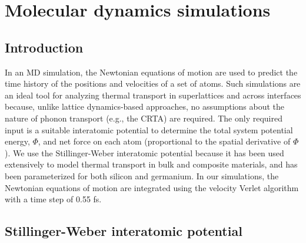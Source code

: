 \documentclass[letterpaper,12pt]{article}
\begin{document}
\clearpage

\section{\label{S-MD}Molecular dynamics simulations}

\subsection{\label{S-MD-intro}Introduction}

In an MD simulation, the Newtonian equations of motion are used to
predict the time history of the positions and velocities of a set of
atoms. Such simulations are an ideal tool for analyzing thermal
transport in superlattices and across interfaces because, unlike
lattice dynamics-based approaches, no assumptions about the nature
of phonon transport (e.g., the CRTA) are required. The only required
input is a suitable interatomic potential to determine the total
system potential energy, $\Phi$, and net force on each atom
(proportional to the spatial derivative of $\Phi$). We use the
Stillinger-Weber interatomic potential because it has been used
extensively to model thermal transport in bulk and composite
materials,\cite{zhao2005,schelling2002,schelling2003,volz2000,bodapati2006,becker2006}
and has been parameterized for both silicon\cite{stillinger1985} and
germanium.\cite{ding1986} In our simulations, the Newtonian
equations of motion are integrated using the velocity Verlet
algorithm with a time step of 0.55 fs.

\subsection{\label{S-MD-SW}Stillinger-Weber interatomic potential}
\end{document}
